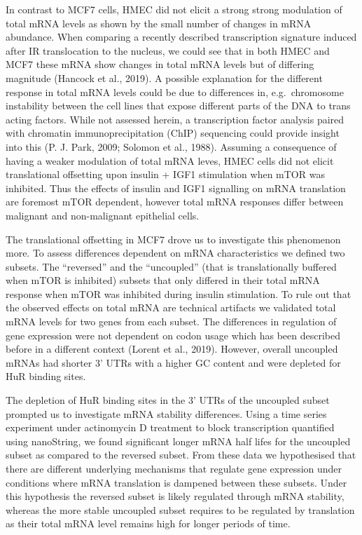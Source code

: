 \documentclass[12pt,openany]{book}
\begin{document}
In contrast to MCF7 cells, HMEC did not elicit a strong strong
modulation of total mRNA levels as shown by the small number of changes
in mRNA abundance. When comparing a recently described transcription
signature induced after IR translocation to the nucleus, we could see
that in both HMEC and MCF7 these mRNA show changes in total mRNA levels
but of differing magnitude (Hancock et al., 2019). A possible
explanation for the different response in total mRNA levels could be due
to differences in, e.g.~chromosome instability between the cell lines
that expose different parts of the DNA to trans acting factors. While
not assessed herein, a transcription factor analysis paired with
chromatin immunoprecipitation (ChIP) sequencing could provide insight
into this (P. J. Park, 2009; Solomon et al., 1988). Assuming a
consequence of having a weaker modulation of total mRNA leves, HMEC
cells did not elicit translational offsetting upon insulin + IGF1
stimulation when mTOR was inhibited. Thus the effects of insulin and
IGF1 signalling on mRNA translation are foremost mTOR dependent, however
total mRNA responses differ between malignant and non-malignant
epithelial cells.

The translational offsetting in MCF7 drove us to investigate this
phenomenon more. To assess differences dependent on mRNA characteristics
we defined two subsets. The ``reversed'' and the ``uncoupled'' (that is
translationally buffered when mTOR is inhibited) subsets that only
differed in their total mRNA response when mTOR was inhibited during
insulin stimulation. To rule out that the observed effects on total mRNA
are technical artifacts we validated total mRNA levels for two genes
from each subset. The differences in regulation of gene expression were
not dependent on codon usage which has been described before in a
different context (Lorent et al., 2019). However, overall uncoupled
mRNAs had shorter 3' UTRs with a higher GC content and were depleted for
HuR binding sites.

The depletion of HuR binding sites in the 3' UTRs of the uncoupled
subset prompted us to investigate mRNA stability differences. Using a
time series experiment under actinomycin D treatment to block
transcription quantified using nanoString, we found significant longer
mRNA half lifes for the uncoupled subset as compared to the reversed
subset. From these data we hypothesised that there are different
underlying mechanisms that regulate gene expression under conditions
where mRNA translation is dampened between these subsets. Under this
hypothesis the reversed subset is likely regulated through mRNA
stability, whereas the more stable uncoupled subset requires to be
regulated by translation as their total mRNA level remains high for
longer periods of time.
\end{document}
